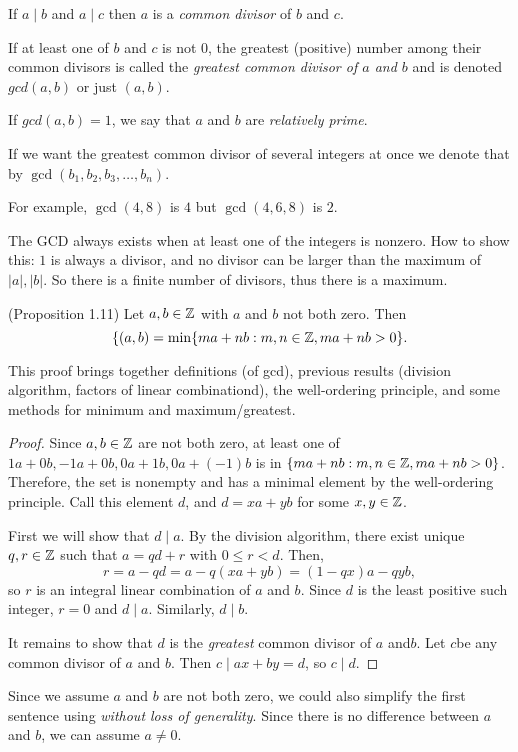 \documentclass{ximera}
\begin{document}
\begin{defn} If $a\mid b$ and $a\mid c$ then $a$ is a \emph{common divisor} of $b$ and $c$.

 If at least one of $b$ and $c$ is not $0$, the greatest (positive) number among their common divisors  is called the \emph{greatest common divisor of $a$ and $b$} and is denoted $gcd(a,b)$ or just $(a,b)$. 
 
 If $gcd(a,b)=1$, we say that $a$ and $b$ are \emph{relatively prime}.

If we want the greatest common divisor of several integers at once we denote that by $\gcd(b_1,b_2,b_3,\dots,b_n)$.
\end{defn}

For example, $\gcd(4,8)$ is $4$ but $\gcd(4,6,8)$ is $2$.

The GCD always exists when at least one of the integers is nonzero. How to show this: $1$ is always a divisor, and no divisor can be larger than the maximum of $|a|,|b|$. So there is a finite number of divisors, thus there is a maximum.


\begin{prop*}(Proposition 1.11) 
 Let $a, b\in \mathbb Z$ with $a$ and $b$ not both zero. Then 
 \[\{(a,b)=\min\{ma+nb:m,n\in\mathbb Z, ma+nb>0\}.\]
\end{prop*}
This proof brings together definitions (of gcd), previous results (division algorithm, factors of linear combinationd), the well-ordering principle, and some methods for minimum and maximum/greatest.
\begin{proof}
 Since $a,b\in\mathbb Z$ are not both zero, at least one of $1a+0b, -1a+0b, 0a+1b, 0a+(-1)b$ is in $\{ma+nb:m,n\in\mathbb Z, ma+nb>0\}$. Therefore, the set is nonempty and has a minimal element by the well-ordering principle. Call this element $d$, and $d=xa+yb$ for some $x,y\in \mathbb Z$.
 
First we will show that $d\mid a$. By the division algorithm, there exist unique $q,r\in\mathbb Z$ such that $a=qd+r$ with $0\leq r<d$. Then, \[r=a-qd=a-q(xa+yb)=(1-qx)a-qyb,\] so $r$ is an integral linear combination of $a$ and $b$.  Since $d$ is the least positive such integer, $r=0$ and $d\mid a$. Similarly, $d\mid b$. 

It remains to show that $d$ is the \emph{greatest} common divisor of $a$ and$b$. Let $c$be any common divisor of $a$  and $b$. Then $c\mid ax+by=d$, so $c\mid d$.
\end{proof}

Since we assume $a$ and $b$ are not both zero, we could also simplify the first sentence using \emph{without loss of generality}. Since there is no difference between $a$ and $b$, we can assume $a\neq0$.
\end{document}
